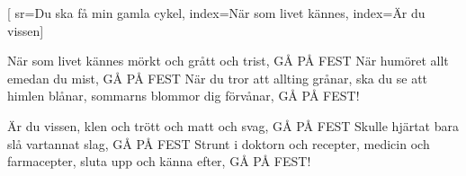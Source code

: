 [ 							
	sr={Du ska få min gamla cykel},					
	index={När som livet kännes},
	index={Är du vissen}]		
	
\beginverse*						
När som livet kännes mörkt och grått och trist,
GÅ PÅ FEST
När humöret allt emedan du mist,
GÅ PÅ FEST
När du tror att allting grånar, 
ska du se att himlen blånar, 
sommarns blommor dig förvånar, 
GÅ PÅ FEST!
\endverse						

\beginverse				
Är du vissen, klen och trött och matt och svag, 
GÅ PÅ FEST
Skulle hjärtat bara slå vartannat slag, 
GÅ PÅ FEST
Strunt i doktorn och recepter, 
medicin och farmacepter, 
sluta upp och känna efter, 
GÅ PÅ FEST!
\endverse				
\endsong		
